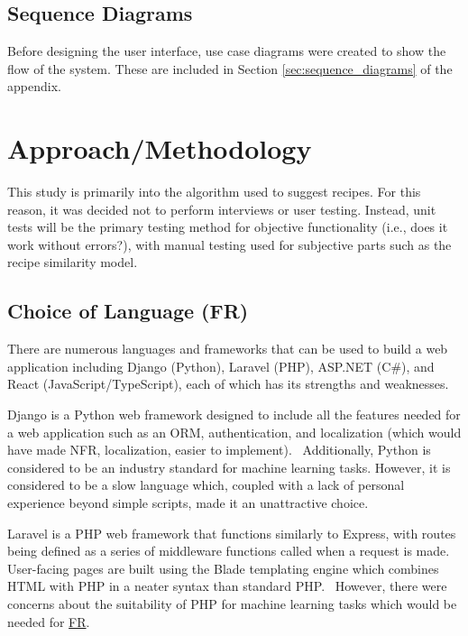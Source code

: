 \subsection{Sequence Diagrams}

Before designing the user interface, use case diagrams were created to show the flow of the system. These are included in Section \ref{sec:sequence_diagrams}
of the appendix.

\section{Approach/Methodology}\label{sec:approach_methodology}

This study is primarily into the algorithm used to suggest recipes. For this reason,
it was decided not to perform interviews or user testing. Instead, unit tests will
be the primary testing method for objective functionality (i.e., does it work without errors?),
with manual testing used for subjective parts such as the recipe similarity model.

\subsection{Choice of Language (FR)}\label{sec:language}

There are numerous languages and frameworks that can be used to build a web application including
Django (Python), Laravel (PHP), ASP.NET (C\#), and React (JavaScript/TypeScript), each of which has
its strengths and weaknesses.

Django is a Python web framework designed to include all the features needed for a web application such
as an ORM, authentication, and localization (which would have made NFR, localization,
easier to implement).~\cite{ghimire_comparative_2020} Additionally, Python is considered to be an
industry standard for machine learning tasks. However, it is considered to be a slow language\cite{srinath_pythonfastest_2017}
which, coupled with a lack of personal experience beyond simple scripts, made it an unattractive choice.

Laravel is a PHP web framework that functions similarly to Express, with routes being defined as a series of
middleware functions called when a request is made. User-facing pages are built using the Blade templating engine
which combines HTML with PHP in a neater syntax than standard PHP.~\cite{nguyen_building_2015,he_design_2015}
However, there were concerns about the suitability of PHP for machine learning tasks which would be needed for
\hyperref[req:similar_recipes]{FR}.

